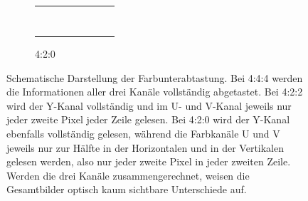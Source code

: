 {\begin{figure}[!p]
\begin{center}
\begin{subfigure}{.3\textwidth}
	\begin{tabular}{cccccccc}
	{\cellcolor[HTML]{90ABE9}} & {\cellcolor[HTML]{90ABE9}} & {\cellcolor[HTML]{90AEE3}} & {\cellcolor[HTML]{90AEE3}} & {\cellcolor[HTML]{B2BCE4}} & {\cellcolor[HTML]{8F9EC6}} & {\cellcolor[HTML]{A0A9C4}} & {\cellcolor[HTML]{A4ADC7}} \\
	{\cellcolor[HTML]{93ADEB}} & {\cellcolor[HTML]{93ADEB}} & {\cellcolor[HTML]{A1BEF0}} & {\cellcolor[HTML]{B4D1FE}} & {\cellcolor[HTML]{DAE3FF}} & {\cellcolor[HTML]{E2E9FF}} & {\cellcolor[HTML]{D6DFF2}} & {\cellcolor[HTML]{A8B1CA}} \\
	{\cellcolor[HTML]{ACBAE0}} & {\cellcolor[HTML]{D8E5FF}} & {\cellcolor[HTML]{F7FBFD}} & {\cellcolor[HTML]{F9FDFF}} & {\cellcolor[HTML]{E9EFEC}} & {\cellcolor[HTML]{CED6D2}} & {\cellcolor[HTML]{DBDEDB}} & {\cellcolor[HTML]{D2D5D2}} \\
	{\cellcolor[HTML]{A6B5DB}} & {\cellcolor[HTML]{CFDDF9}} & {\cellcolor[HTML]{D6DCDE}} & {\cellcolor[HTML]{CCD2D4}} & {\cellcolor[HTML]{9FA7A3}} & {\cellcolor[HTML]{9FA7A3}} & {\cellcolor[HTML]{B9BCB9}} & {\cellcolor[HTML]{A9ACA9}} \\
	{\cellcolor[HTML]{DADCDA}} & {\cellcolor[HTML]{AEB1AE}} & {\cellcolor[HTML]{D6D5DA}} & {\cellcolor[HTML]{E3E2E6}} & {\cellcolor[HTML]{D5D7DD}} & {\cellcolor[HTML]{B4B6BC}} & {\cellcolor[HTML]{B3B2C5}} & {\cellcolor[HTML]{A6A5B8}} \\
	{\cellcolor[HTML]{E2E4E2}} & {\cellcolor[HTML]{F5F7F5}} & {\cellcolor[HTML]{F0EFF3}} & {\cellcolor[HTML]{B9B8BD}} & {\cellcolor[HTML]{8C8E94}} & {\cellcolor[HTML]{919399}} & {\cellcolor[HTML]{B5B4C6}} & {\cellcolor[HTML]{A5A4B7}} \\
	{\cellcolor[HTML]{B8BDCD}} & {\cellcolor[HTML]{C3C8D5}} & {\cellcolor[HTML]{F6F7F7}} & {\cellcolor[HTML]{FBFCFC}} & {\cellcolor[HTML]{EDF0EF}} & {\cellcolor[HTML]{9EA1A0}} & {\cellcolor[HTML]{A7ABB0}} & {\cellcolor[HTML]{A1A6AB}} \\
	{\cellcolor[HTML]{979EAE}} & {\cellcolor[HTML]{9BA2B2}} & {\cellcolor[HTML]{C8CACA}} & {\cellcolor[HTML]{E1E3E3}} & {\cellcolor[HTML]{FAFCFC}} & {\cellcolor[HTML]{DEE1E0}} & {\cellcolor[HTML]{AEB1B5}} & {\cellcolor[HTML]{A5A9AE}} \\
	\end{tabular}
  \caption{4:2:0}
\end{subfigure}
\end{center}
  \caption{Schematische Darstellung der Farbunterabtastung. Bei 4:4:4 werden die Informationen aller drei Kanäle vollständig abgetastet. Bei 4:2:2 wird der Y-Kanal vollständig und im U- und V-Kanal jeweils nur jeder zweite Pixel jeder Zeile gelesen. Bei 4:2:0 wird der Y-Kanal ebenfalls vollständig gelesen, während die Farbkanäle U und V jeweils nur zur Hälfte in der Horizontalen und in der Vertikalen gelesen werden, also nur jeder zweite Pixel in jeder zweiten Zeile. Werden die drei Kanäle zusammengerechnet, weisen die Gesamtbilder optisch kaum sichtbare Unterschiede auf.}
\label{abb:video_farbunterabtastung}
\end{figure}
}%

